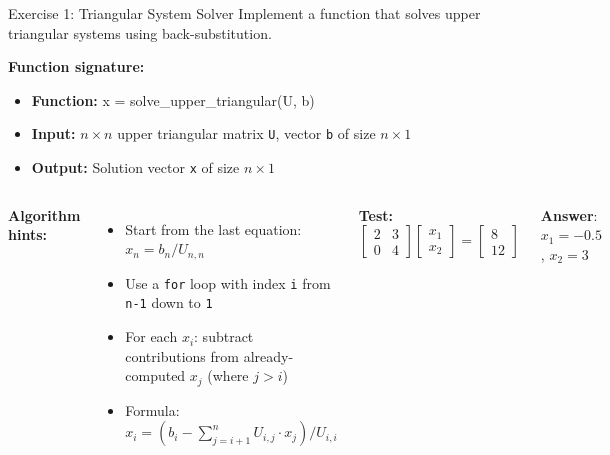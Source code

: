 \documentclass[aspectratio=169]{beamer}
\begin{document}
\begin{frame}{Exercise 1: Triangular System Solver}
	\small{\textcolor{NavyBlue}{Implement a function that solves upper triangular systems using back-substitution.}}
	\vspace{0.2cm}

	\small{
		\textbf{Function signature:}
		\begin{itemize}
			\item[] \textbf{Function:} x = solve\_upper\_triangular(U, b)
			\item[] \textbf{Input:} $n \times n$ upper triangular matrix \texttt{U}, vector \texttt{b} of size $n \times 1$
			\item[] \textbf{Output:} Solution vector \texttt{x} of size $n \times 1$
		\end{itemize}
	}

	\vspace{0.2cm}

	\begin{columns}
		\scriptsize{
			\textbf{Algorithm hints:}
			\begin{itemize}
				\item[] Start from the last equation: $x_n = b_n / U_{n,n}$
				\item[] Use a \texttt{for} loop with index \texttt{i} from \texttt{n-1} down to \texttt{1}
				\item[] For each $x_i$: subtract contributions from already-computed $x_j$ (where $j > i$)
				\item[] Formula: $x_i = (b_i - \sum_{j=i+1}^{n} U_{i,j} \cdot x_j) / U_{i,i}$
			\end{itemize}
		}

		\footnotesize{
			\textbf{Test:} $\begin{bmatrix} 2 & 3 \\ 0 & 4 \end{bmatrix} \begin{bmatrix} x_1 \\ x_2 \end{bmatrix} = \begin{bmatrix} 8 \\ 12 \end{bmatrix}$

			\vspace{0.6cm}
			\textbf{Answer}: $x_1 = -0.5$, $x_2 = 3$
		}
	\end{columns}
\end{frame}
\end{document}
